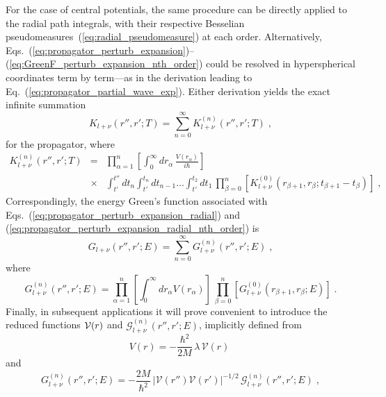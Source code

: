 \documentclass[a4paper,preprint,draft,showpacs,amsmath,amsfonts,amssymb,aps,prd]{revtex4}%
\begin{document}
For the case of central potentials,
the same procedure can be directly applied to the radial path integrals,
with their respective Besselian
pseudomeasures~(\ref{eq:radial_pseudomeasure}) at each order.
Alternatively, 
Eqs.~(\ref{eq:propagator_perturb_expansion})--(\ref{eq:GreenF_perturb_expansion_nth_order})
 could be resolved in hyperspherical coordinates term by term---as in the derivation
leading to Eq.~(\ref{eq:propagator_partial_wave_exp}). 
Either derivation
yields the exact infinite summation
\begin{equation}
K_{l+\nu} (r'',r';T) =
\sum_{n=0}^{\infty}
K^{(n)}_{l+\nu} (r'',r';T) 
\;  ,
\label{eq:propagator_perturb_expansion_radial}
\end{equation}
for the propagator, where 
\begin{eqnarray}
K^{(n)}_{l+\nu} (r'',r';T) 
& = &
\prod_{\alpha=1}^{n} \left[
 \int_{0}^{\infty} 
d r_{\alpha} \,
\frac{   V(r_{\alpha})  }{i \hbar} 
\right]
\nonumber 
\\
& \times &
\int_{t'}^{t''} dt_{n} 
\int_{t'}^{t_{n}} dt_{n-1} 
\ldots
\int_{t'}^{t_{2}} dt_{1} 
\,
\prod_{\beta=0}^{n} 
\left[
K^{(0)}_{l+\nu} (r_{\beta+1},r_{\beta};
t_{\beta+1}-t_{\beta} )  \right]
\;   ,
\label{eq:propagator_perturb_expansion_radial_nth_order}
\end{eqnarray}
Correspondingly, the 
energy Green's function associated
with Eqs.~(\ref{eq:propagator_perturb_expansion_radial}) and 
(\ref{eq:propagator_perturb_expansion_radial_nth_order}) is
\begin{equation}
G_{l+\nu} (r'',r';E) =
\sum_{n=0}^{\infty}
G^{(n)}_{l+\nu} (r'',r';E) 
\; ,
\label{eq:GreenF_perturb_expansion_radial}
\end{equation}
where
\begin{equation}
G^{(n)}_{l+\nu} (r'',r';E) 
=
\prod_{\alpha=1}^{n} 
\left[ \int_{0}^{\infty}
d r_{\alpha} 
 V(r_{\alpha})  \right]
\,
\prod_{\beta=0}^{n} \left[ 
G^{(0)}_{l+\nu} (r_{\beta +1},r_{\beta};E) 
  \right]
\;  .
\label{eq:GreenF_perturb_expansion_radial_nth_order}
\end{equation}
Finally, in subsequent applications it will prove convenient to introduce the reduced
functions ${\cal V} (r)$
 and $ {\mathcal G}^{(n)}_{l+\nu} (r'',r';E)    $,
implicitly defined from
\begin{equation}
V ( r ) = - \frac{\hbar^{2}}{2M}\, \lambda \,
{\mathcal V} (r)
\;  
\label{eq:reduced_potential}
\end{equation}
and
\begin{equation}
G^{(n)}_{l+\nu} (r'',r';E)    
 = 
 -
\frac{2M}{\hbar^{2}} 
\,
\left| 
{\mathcal V} (r'')
{\mathcal V} (r')
\right|^{-1/2}
\,
{\mathcal G}^{(n)}_{l+\nu} (r'',r';E)    
\;  ,
\label{eq:reduced_GreenF}
\end{equation}
\end{document}
